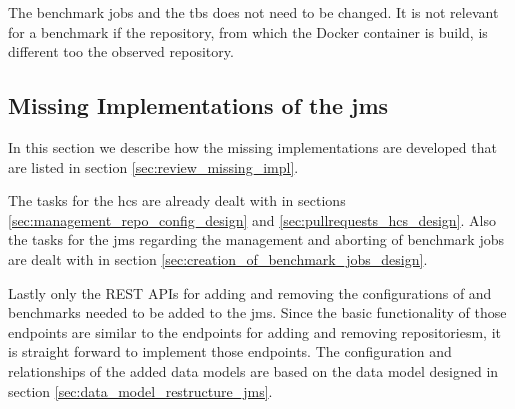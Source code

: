 The benchmark jobs and the \acl{tbs} does not need to be changed.
It is not relevant for a benchmark if the repository, from which the Docker container is build, is different too the observed repository.


\subsection{Missing Implementations of the \acl{jms}}
In this section we describe how the missing implementations are developed that are listed in section \ref{sec:review_missing_impl}.

The tasks for the \ac{hcs} are already dealt with in sections \ref{sec:management_repo_config_design} and \ref{sec:pullrequests_hcs_design}.
Also the tasks for the \ac{jms} regarding the management and aborting of benchmark jobs are dealt with in section \ref{sec:creation_of_benchmark_jobs_design}.

Lastly only the REST APIs for adding and removing the configurations of \tsp{} and benchmarks needed to be added to the \ac{jms}.
Since the basic functionality of those endpoints are similar to the endpoints for adding and removing repositoriesm, it is straight forward to implement those endpoints.
The configuration and relationships of the added data models are based on the data model designed in section \ref{sec:data_model_restructure_jms}.




